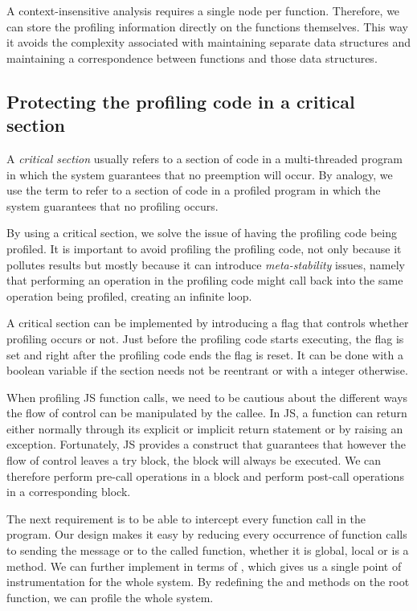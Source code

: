 A context-insensitive analysis requires a single node per function. Therefore,
we can store the profiling information directly on the functions themselves.
This way it avoids the complexity associated with maintaining separate data
structures and maintaining a correspondence between functions and those data
structures.

\subsection{Protecting the profiling code in a critical section} 

A \textit{critical section} usually refers to a section of code in a
multi-threaded program in which the system guarantees that no preemption will
occur. By analogy, we use the term to refer to a section of code in a profiled
program in which the system guarantees that no profiling occurs.

By using a critical section, we solve the issue of having the profiling code
being profiled. It is important to avoid profiling the profiling code, not only
because it pollutes results but mostly because it can introduce
\textit{meta-stability} issues, namely that performing an operation in the
profiling code might call back into the same operation being profiled, creating
an infinite loop.

A critical section can be implemented by introducing a flag that controls
whether profiling occurs or not. Just before the profiling code starts
executing, the flag is set and right after the profiling code ends the flag is
reset. It can be done with a boolean variable if the section needs not be
reentrant or with a integer otherwise.

When profiling JS function calls, we need to be cautious about the different
ways the flow of control can be manipulated by the callee. In JS, a function
can return either normally through its explicit or implicit return statement or
by raising an exception. Fortunately, JS provides a  construct that
guarantees that however the flow of control leaves a try block, the 
block will always be executed. We can therefore perform pre-call operations in
a  block and perform post-call operations in a corresponding
 block.

The next requirement is to be able to intercept every function call in the
program. Our design makes it easy by reducing every occurrence of function calls
to sending the message  or  to the called function, whether
it is global, local or is a method. We can further implement  in terms
of , which gives us a single point of instrumentation for the whole
system. By redefining the  and  methods on the root function,
we can profile the whole system.

